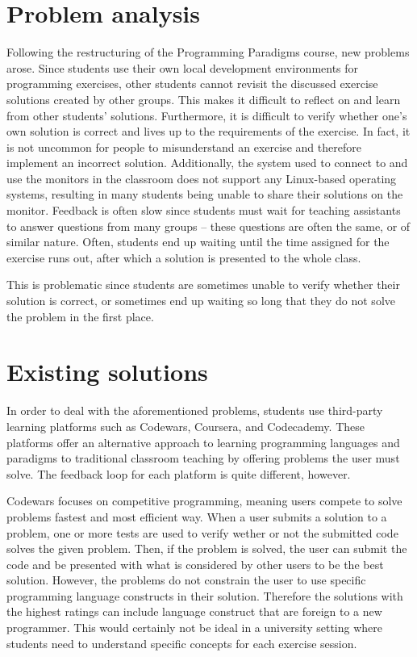 \section{Problem analysis}
Following the restructuring of the Programming Paradigms course, new problems arose.
Since students use their own local development environments for programming exercises, other students cannot revisit the discussed exercise solutions created by other groups.
This makes it difficult to reflect on and learn from other students' solutions.
Furthermore, it is difficult to verify whether one's own solution is correct and lives up to the requirements of the exercise.
In fact, it is not uncommon for people to misunderstand an exercise and therefore implement an incorrect solution.
Additionally, the system used to connect to and use the monitors in the classroom does not support any Linux-based operating systems, resulting in many students being unable to share their solutions on the monitor.
Feedback is often slow since students must wait for teaching assistants to answer questions from many groups -- these questions are often the same, or of similar nature.
Often, students end up waiting until the time assigned for the exercise runs out, after which a solution is presented to the whole class.

This is problematic since students are sometimes unable to verify whether their solution is correct, or sometimes end up waiting so long that they do not solve the problem in the first place.

\section{Existing solutions}
In order to deal with the aforementioned problems, students use third-party learning platforms such as Codewars\cite{Codewars}, Coursera\cite{Coursera}, and Codecademy\cite{Codecademy}.
These platforms offer an alternative approach to learning programming languages and paradigms to traditional classroom teaching by offering problems the user must solve.
The feedback loop for each platform is quite different, however.


Codewars focuses on competitive programming, meaning users compete to solve problems fastest and most efficient way.
 When a user submits a solution to a problem, one or more tests are used to verify wether or not the submitted code solves the given problem. Then, if the problem is solved, the user can submit the code and be presented with what is considered by other users to be the best solution. 
 However, the problems do not constrain the user to use specific programming language constructs in their solution.
  Therefore the solutions with the highest ratings can include language construct that are foreign to a new programmer. 
This would certainly not be ideal in a university setting where students need to understand specific concepts for each exercise session.


